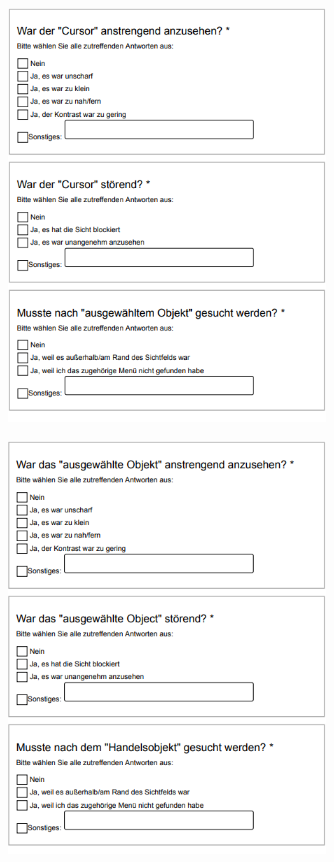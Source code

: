 	\begin{figure}[htbp]
		\centering
		\includegraphics[width=0.75\textwidth]{Fragen/5Szenario.png}
	\end{figure}

	\begin{figure}[htbp]
		\centering
		\includegraphics[width=0.75\textwidth]{Fragen/6Szenario.png}
	\end{figure}

